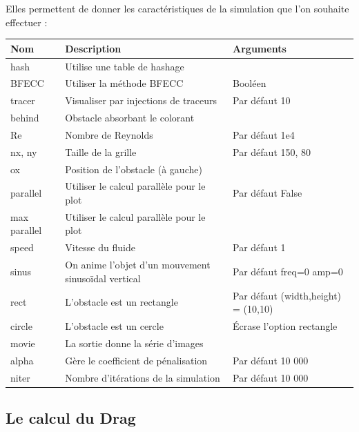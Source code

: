 		Elles permettent de donner les caractéristiques de la simulation que l'on souhaite effectuer :\\
			\begin{table}

			\begin{tabular}{|l | p{7cm}| l |}
				\hline
				Nom & Description & Arguments\\
				\hline
				\-\-hash & Utilise une table de hashage & \\
				\hline
				\-\-BFECC & Utiliser la méthode BFECC & Booléen\\
				\hline
				\-\-tracer & Visualiser par injections de traceurs & Par défaut 10\\
				\hline
				\-\-behind & Obstacle absorbant le colorant & \\
				\hline
				\-\-Re & Nombre de Reynolds &  Par défaut 1e4\\
				\hline
				\-\-nx, \-\-ny & Taille de la grille &  Par défaut 150, 80\\
				\hline
				\-\-ox & Position de l'obstacle (à gauche) &\\
				\hline
				\-\-parallel & Utiliser le calcul parallèle pour le plot& Par défaut False\\
				\hline
				\-\-max parallel & Utiliser le calcul parallèle pour le plot & \\
				\hline
				\-\-speed & Vitesse du fluide & Par défaut 1 \\
				\hline
				\-\-sinus & On anime l'objet d'un mouvement sinusoïdal vertical & Par défaut freq=0 amp=0\\
				\hline
				\-\-rect & L'obstacle est un rectangle & Par défaut (width,height) = (10,10)\\
				\hline
				\-\-circle & L'obstacle est un cercle & Écrase l'option rectangle\\
				\hline
				\-\-movie & La sortie donne la série d'images  & \\
				\hline
				\-\-alpha & Gère le coefficient de pénalisation & Par défaut 10 000\\
				\hline
				\-\-niter & Nombre d'itérations de la simulation & Par défaut 10 000\\
				\hline
			\end{tabular}
						
			\end{table}
			
	\subsection{Le calcul du Drag}
	
